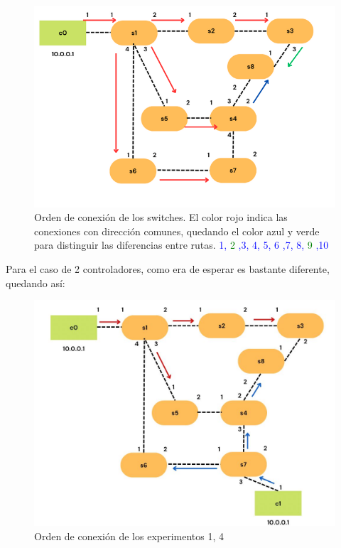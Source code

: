 \documentclass[a4paper, 12pt]{book}
\begin{document}
 	\begin{figure}[H]
 		\centering
 		\includegraphics[width=16cm, keepaspectratio]{img/rutasEscenario1-1c}
 		\caption{Orden de conexión de los switches. El color rojo indica las conexiones con dirección comunes, quedando el color azul y verde para distinguir las diferencias entre rutas. \textcolor{blue}{1,}  \textcolor{green}{2}  \textcolor{blue}{,3, 4, 5, 6 ,7, 8,}  \textcolor{green}{9} \textcolor{blue}{,10}}
 		\label{figura:escenario1_1c_1}
 	\end{figure}
 	
 	Para el caso de 2 controladores, como era de esperar es bastante diferente, quedando así:
 	
 	\begin{figure}[H]
 		\centering
 		\includegraphics[width=16cm, keepaspectratio]{img/escenario1_2c_1}
 		\caption{Orden de conexión de los experimentos 1, 4}
 		\label{figura:escenario1_2c_1}
 	\end{figure}
 	
\end{document}
